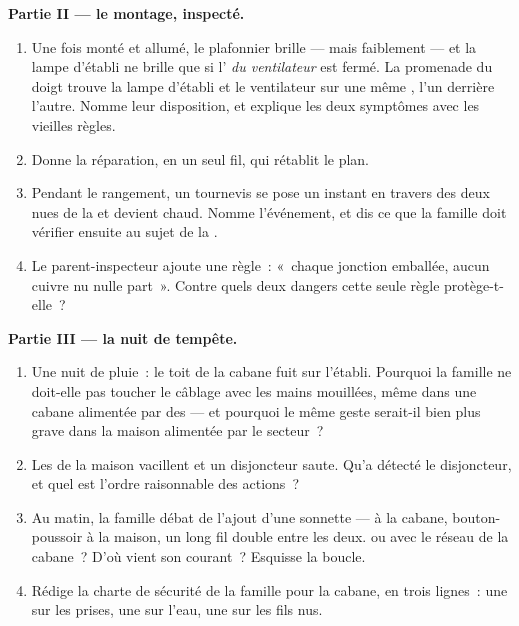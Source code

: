 \begin{problem}
\medskip\noindent\textbf{Partie II --- le montage, inspecté.}
\begin{enumerate}[resume]
  \item Une fois monté et allumé, le plafonnier brille --- mais
        faiblement --- et la lampe d'établi ne brille que si
        l' \emph{du ventilateur} est fermé. La
        promenade du doigt trouve la lampe d'établi et le
        ventilateur sur une même , l'un derrière l'autre.
        Nomme leur disposition, et explique les deux symptômes avec
        les vieilles règles.
  \item Donne la réparation, en un seul fil, qui rétablit le plan.
  \item Pendant le rangement, un tournevis se pose un instant en
        travers des deux  nues de la  et devient chaud.
        Nomme l'événement, et dis ce que la famille doit vérifier
        ensuite au sujet de la .
  \item Le parent-inspecteur ajoute une règle~: «~chaque jonction
        emballée, aucun cuivre nu nulle part~». Contre quels deux
        dangers cette seule règle protège-t-elle~?
\end{enumerate}

\medskip\noindent\textbf{Partie III --- la nuit de tempête.}
\begin{enumerate}[resume]
  \item Une nuit de pluie~: le toit de la cabane fuit sur
        l'établi. Pourquoi la famille ne doit-elle pas toucher le
        câblage avec les mains mouillées, même dans une cabane
        alimentée par des  --- et pourquoi le même geste
        serait-il bien plus grave dans la maison alimentée par le
        secteur~?
  \item Les  de la maison vacillent et un disjoncteur
        saute. Qu'a détecté le disjoncteur, et quel est l'ordre
        raisonnable des actions~?
  \item Au matin, la famille débat de l'ajout d'une sonnette ---
         à la cabane, bouton-poussoir à la maison, un long
        fil double entre les deux.  ou  avec
        le réseau de la cabane~? D'où vient son courant~? Esquisse
        la boucle.
  \item Rédige la charte de sécurité de la famille pour la cabane,
        en trois lignes~: une sur les prises, une sur l'eau, une
        sur les fils nus.
\end{enumerate}
\end{problem}
